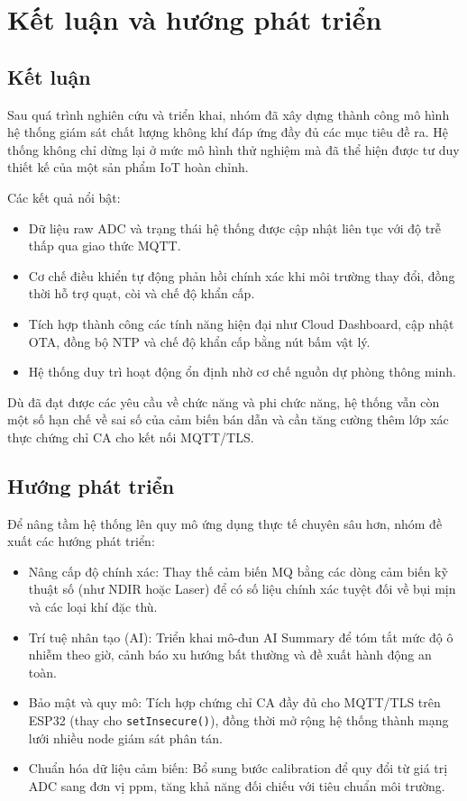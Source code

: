 \documentclass[../BTL_PTIT.tex]{subfiles}
\begin{document}
\section{Kết luận và hướng phát triển}

\subsection{Kết luận}
Sau quá trình nghiên cứu và triển khai, nhóm đã xây dựng thành công mô hình hệ thống giám sát chất lượng không khí đáp ứng đầy đủ các mục tiêu đề ra. Hệ thống không chỉ dừng lại ở mức mô hình thử nghiệm mà đã thể hiện được tư duy thiết kế của một sản phẩm IoT hoàn chỉnh.

Các kết quả nổi bật:
\begin{itemize}[label=\textbullet]
	\item Dữ liệu raw ADC và trạng thái hệ thống được cập nhật liên tục với độ trễ thấp qua giao thức MQTT.
	\item Cơ chế điều khiển tự động phản hồi chính xác khi môi trường thay đổi, đồng thời hỗ trợ quạt, còi và chế độ khẩn cấp.
	\item Tích hợp thành công các tính năng hiện đại như Cloud Dashboard, cập nhật OTA, đồng bộ NTP và chế độ khẩn cấp bằng nút bấm vật lý.
	\item Hệ thống duy trì hoạt động ổn định nhờ cơ chế nguồn dự phòng thông minh.
\end{itemize}

Dù đã đạt được các yêu cầu về chức năng và phi chức năng, hệ thống vẫn còn một số hạn chế về sai số của cảm biến bán dẫn và cần tăng cường thêm lớp xác thực chứng chỉ CA cho kết nối MQTT/TLS.

\subsection{Hướng phát triển}
Để nâng tầm hệ thống lên quy mô ứng dụng thực tế chuyên sâu hơn, nhóm đề xuất các hướng phát triển:
\begin{itemize}[label=\textbullet]
	\item Nâng cấp độ chính xác: Thay thế cảm biến MQ bằng các dòng cảm biến kỹ thuật số (như NDIR hoặc Laser) để có số liệu chính xác tuyệt đối về bụi mịn và các loại khí đặc thù.
	\item Trí tuệ nhân tạo (AI): Triển khai mô-đun AI Summary để tóm tắt mức độ ô nhiễm theo giờ, cảnh báo xu hướng bất thường và đề xuất hành động an toàn.
	\item Bảo mật và quy mô: Tích hợp chứng chỉ CA đầy đủ cho MQTT/TLS trên ESP32 (thay cho \texttt{setInsecure()}), đồng thời mở rộng hệ thống thành mạng lưới nhiều node giám sát phân tán.
	\item Chuẩn hóa dữ liệu cảm biến: Bổ sung bước calibration để quy đổi từ giá trị ADC sang đơn vị ppm, tăng khả năng đối chiếu với tiêu chuẩn môi trường.
\end{itemize}
\end{document}
